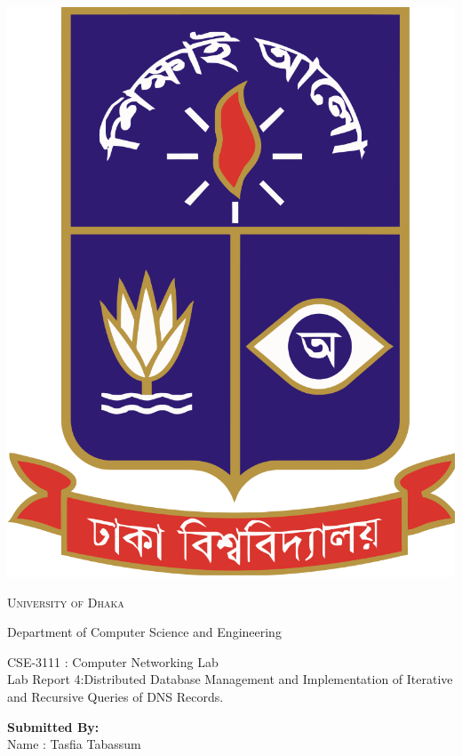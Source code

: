 \documentclass[11pt]{article}
\begin{document}
\begin{titlepage}
	\begin{center}
    	\includegraphics[scale=0.10]{du.png}\par
		\begin{Huge}
			\textsc{University of Dhaka}\par
		\end{Huge}
		\begin{Large}
			Department of Computer Science and Engineering\par \vspace{.5cm}
			CSE-3111 : Computer Networking Lab \\[12pt]	
			Lab Report 4:Distributed Database Management and Implementation of Iterative and Recursive Queries of DNS Records.
		\end{Large}
	\end{center}  	
	\begin{large}
		\textbf{Submitted By:\\[12pt]}
			Name : Tasfia Tabassum\\[8pt]

\end{large}
\end{titlepage}
\end{document}
